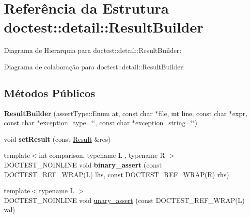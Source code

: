 \hypertarget{structdoctest_1_1detail_1_1ResultBuilder}{}\section{Referência da Estrutura doctest\+:\+:detail\+:\+:Result\+Builder}
\label{structdoctest_1_1detail_1_1ResultBuilder}


Diagrama de Hierarquia para doctest\+:\+:detail\+:\+:Result\+Builder\+:


Diagrama de colaboração para doctest\+:\+:detail\+:\+:Result\+Builder\+:
\subsection*{Métodos Públicos}
\begin{DoxyCompactItemize}
\item 
\mbox{\label{structdoctest_1_1detail_1_1ResultBuilder_af1af5a8d0991b4fe3548107f111e968d}} 
{\bfseries Result\+Builder} (assert\+Type\+::\+Enum at, const char $\ast$file, int line, const char $\ast$expr, const char $\ast$exception\+\_\+type=\char`\"{}\char`\"{}, const char $\ast$exception\+\_\+string=\char`\"{}\char`\"{})
\item 
\mbox{\label{structdoctest_1_1detail_1_1ResultBuilder_a86c0ca727fead43263de4a7e9a59ad23}} 
void {\bfseries set\+Result} (const \hyperlink{structdoctest_1_1detail_1_1Result}{Result} \&res)
\item 
\mbox{\label{structdoctest_1_1detail_1_1ResultBuilder_ab3d55b158b3ae687f80bca94db6bb701}} 
{\footnotesize template$<$int comparison, typename L , typename R $>$ }\\D\+O\+C\+T\+E\+S\+T\+\_\+\+N\+O\+I\+N\+L\+I\+NE void {\bfseries binary\+\_\+assert} (const D\+O\+C\+T\+E\+S\+T\+\_\+\+R\+E\+F\+\_\+\+W\+R\+AP(L) lhs, const D\+O\+C\+T\+E\+S\+T\+\_\+\+R\+E\+F\+\_\+\+W\+R\+AP(R) rhs)
\item 
{\footnotesize template$<$typename L $>$ }\\D\+O\+C\+T\+E\+S\+T\+\_\+\+N\+O\+I\+N\+L\+I\+NE void \hyperlink{structdoctest_1_1detail_1_1ResultBuilder_a98c33e90242e2859255a79cb38489f3b}{unary\+\_\+assert} (const D\+O\+C\+T\+E\+S\+T\+\_\+\+R\+E\+F\+\_\+\+W\+R\+AP(L) val)

\end{DoxyCompactItemize}
